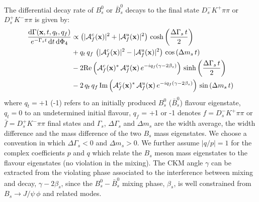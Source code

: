 The differential decay rate of $B_s^{0}$ or $\bar B_s^{0}$ decays to the final state $D_s^{-} K^{+} \pi\pi$ or $D_s^{+} K^{-} \pi\pi$
is given by: 
\begin{equation}
\begin{split}
\label{eq:PDF_full}
	\frac{ \text{d}\Gamma(\mathbf{x},t,q_t,q_f)}{ e^{- \Gamma_s t} \, \text{d}t \, \text{d}\Phi_4} &\propto  
	 \left( \vert \mathcal A^c_{f}(\mathbf{x}) \vert^2 + \vert \mathcal A^u_{f}(\mathbf{x}) \vert^2 \right) \, \text{cosh} \left( \frac{\Delta \Gamma_s \, t}{2}\right) \\
	 & + q_t \, q_f \,  \left( \vert \mathcal A^c_{f}(\mathbf{x}) \vert^2 - \vert \mathcal A^u_{f}(\mathbf{x})  \vert^2 \right) \, \text{cos} \left(\Delta m_s \, t \right)  \\
	 & -2 \text{Re}\left( \mathcal A^c_{f}(\mathbf{x})^{*}  \, \mathcal A^u_{f}(\mathbf{x})  \, e^{-i q_f (\gamma - 2\beta_s)}  \right) \, \text{sinh} \left( \frac{\Delta \Gamma_s \, t}{2}\right)  \\
	 & -2 \, q_t \, q_f \, \text{Im}\left( \mathcal A^c_{f}(\mathbf{x})^{*} \, \mathcal A^u_{f}(\mathbf{x})  \, e^{-i q_f (\gamma - 2\beta_s)}  \right)\, \text{sin} \left(\Delta m_s \, t \right)  
\end{split}
\end{equation}
where $q_t = +1$ (-1) refers to an initially produced $B_s^{0}$ ($\bar B_s^{0}$) flavour eigenstate, $q_t = 0$ to an undetermined initial flavour,
$q_f$ = +1  or -1 denotes $f = D_s^{-} K^{+} \pi\pi$ or $\bar f = D_s^{+} K^{-} \pi\pi$ final states
and $\Gamma_s$, $\Delta \Gamma_s$ and $\Delta m_s$ are 
the width average, the width difference 
and the mass difference of the two $B_s$ 
mass eigenstates.
We choose a convention in which $\Delta\Gamma_s < 0$ and $\Delta m_s > 0$. 
We further assume $\vert q/p \vert = 1$ for the complex coefficients $p$ and $q$ which relate the $B_s$ meson mass eigenstates to the flavour eigenstates (no \CP violation
in the mixing).
The CKM angle $\gamma$ can be extracted from the \CP violating phase associated to the interference between mixing and decay, $\gamma - 2 \beta_s $, 
since the $B_s^{0}-\bar B_s^{0}$ mixing phase, $\beta_s$, is well constrained from $B_s \to J/\psi \, \phi$ and related modes. 

